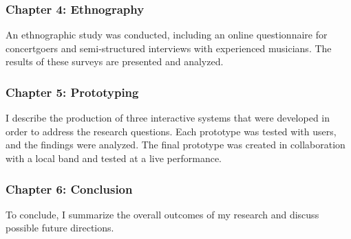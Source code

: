\subsubsection{Chapter 4: Ethnography}

An ethnographic study was conducted, including an online questionnaire for concertgoers and semi-structured interviews with experienced musicians. The results of these surveys are presented and analyzed.
	
\subsubsection{Chapter 5: Prototyping}

I describe the production of three interactive systems that were developed in order to address the research questions. Each prototype was tested with users, and the findings were analyzed. The final prototype was created in collaboration with a local band and tested at a live performance.
		
\subsubsection{Chapter 6: Conclusion}
	
To conclude, I summarize the overall outcomes of my research and discuss possible future directions.